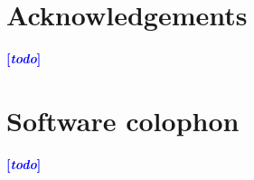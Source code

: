 \documentclass[a4paper,fleqn]{cas-dc}
\newcommand{\tb}[1]{\textcolor{blue}{#1}}
\newcommand{\rk}[1]{\tb{{\footnotesize {\bf[\emph{#1}]}}}}
\begin{document}


\printcredits

\section*{Acknowledgements}
\rk{todo}

\section*{Software colophon}
\rk{todo}




\end{document}
